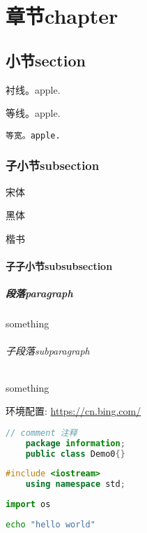 \chapter{章节chapter}
\section{小节section}\label{sec:demo}
{\par\rm 衬线。apple.}
{\par\sf 等线。apple.}
{\par\tt 等宽。apple.}
\subsection{子小节subsection}
{\par\fangsong 宋体}
{\par\heiti 黑体}
{\par\kaishu 楷书}
\subsubsection{子子小节subsubsection}
\contentsname\par
\listfigurename\par
\listtablename\par
\figurename\par
\tablename\par
\abstractname\par
\indexname\par
\appendixname\par
\bibname\par
\proofname\par
\newpage
\paragraph{段落paragraph}
something
\newpage
\subparagraph{子段落subparagraph}
something
\par

环境配置: \url{https://cn.bing.com/}

\begin{lstlisting}[language=java]
    // comment 注释
    package information;
    public class Demo0{}
\end{lstlisting}

\begin{lstlisting}[language=c++]
    #include <iostream>
    using namespace std;
\end{lstlisting}

\begin{lstlisting}[language=python]
    import os
\end{lstlisting}

\begin{lstlisting}[language=bash]
    echo "hello world"
\end{lstlisting}